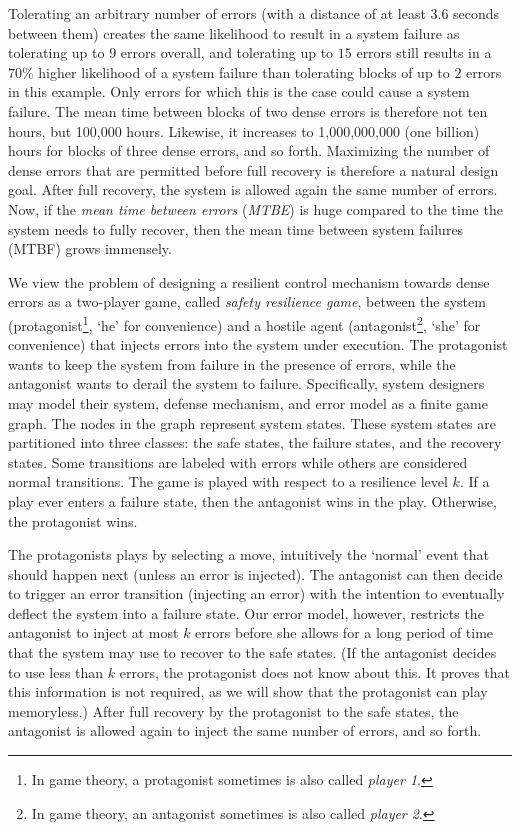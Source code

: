 \documentclass[times,10pt,twocolumn]{article}
\begin{document}
Tolerating an arbitrary number of errors 
(with a distance of at least $3.6$ seconds between them) 
creates the same likelihood to result in a system failure 
as tolerating up to $9$ errors overall, and 
tolerating up to $15$ errors still results 
in a $70\%$ higher likelihood of a system failure 
than tolerating blocks of up to $2$ errors in this example. 
Only errors for which this is the case could cause a system failure.
The mean time between blocks of two dense errors is therefore not ten hours, 
but 100,000\label{reply2.100000} hours.
Likewise, it increases to 1,000,000,000 (one billion) hours for blocks of three dense errors, and so forth.
%
Maximizing the number of dense errors that are permitted before full recovery 
is therefore a natural design goal.  
After full recovery, the system is allowed again the same number of errors.
Now, if the {\em mean time between errors} ({\em MTBE}) 
is huge compared to the time the system needs to fully recover, 
then the mean time between system failures (MTBF) grows immensely.  

We view the problem of designing a resilient control mechanism 
towards dense errors as a two-player game, 
called {\em safety resilience game}, 
between the system (\label{reply1.protagonist.player1}protagonist\footnote{In game theory, a protagonist sometimes is also called {\em player 1}.}, `he' for convenience) 
and a hostile agent (antagonist\footnote{In game theory, an antagonist sometimes is also called {\em player 2}.}, `she' for convenience) 
that injects errors into the system under execution.\label{reply1.antagonist.inject.errors}   
The protagonist wants to keep the system from failure in the presence of errors, 
while the antagonist wants to derail the system to failure. 
\label{reply1.how.models} 
Specifically, 
system designers may model their system, defense mechanism, and error model 
as a finite game graph.  
The nodes in the graph represent system states.
These system states are partitioned into three classes:
the safe states, the failure states, and the recovery states. 
Some transitions are labeled with errors while others are considered normal transitions.  
The game is played with respect to a resilience level $k$.  
If a play ever enters a failure state, then the antagonist wins in the play.  
Otherwise, the protagonist wins.

The protagonists plays by selecting a move, intuitively the `normal' event that should happen next (unless an error is injected).
The antagonist can then decide to trigger 
an error transition (injecting an error) with the intention to
eventually deflect the system into a failure state. 
Our error model, however, restricts 
the antagonist to inject at most $k$ errors before she allows for a long period of time that the system may use to recover to the safe states.
(If the antagonist decides to use less than $k$ errors, the protagonist does not know about this.
It proves that this information is not required, as we will show
\label{reply1.memoryless.future} that the protagonist can play memoryless.)
After full recovery by the protagonist to the safe states, the antagonist is allowed again 
to inject the same number of errors, and so forth.
  
\end{document}
